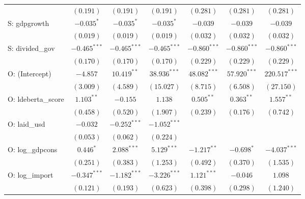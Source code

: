 \begin{table}
\begin{center}
\begin{tabular}{l c c c c c c}
                              & $(0.191)$      & $(0.191)$      & $(0.191)$      & $(0.281)$      & $(0.281)$      & $(0.281)$       \\
S: gdpgrowth                  & $-0.035^{*}$   & $-0.035^{*}$   & $-0.035^{*}$   & $-0.039$       & $-0.039$       & $-0.039$        \\
                              & $(0.019)$      & $(0.019)$      & $(0.019)$      & $(0.032)$      & $(0.032)$      & $(0.032)$       \\
S: divided\_gov               & $-0.465^{***}$ & $-0.465^{***}$ & $-0.465^{***}$ & $-0.860^{***}$ & $-0.860^{***}$ & $-0.860^{***}$  \\
                              & $(0.170)$      & $(0.170)$      & $(0.170)$      & $(0.229)$      & $(0.229)$      & $(0.229)$       \\
O: (Intercept)                & $-4.857$       & $10.419^{**}$  & $38.936^{***}$ & $48.082^{***}$ & $57.920^{***}$ & $220.517^{***}$ \\
                              & $(3.009)$      & $(4.589)$      & $(15.027)$     & $(8.715)$      & $(6.508)$      & $(27.150)$      \\
O: ldeberta\_score            & $1.103^{**}$   & $-0.155$       & $1.138$        & $0.505^{**}$   & $0.363^{**}$   & $1.557^{**}$    \\
                              & $(0.458)$      & $(0.520)$      & $(1.907)$      & $(0.239)$      & $(0.176)$      & $(0.742)$       \\
O: laid\_usd                  & $-0.032$       & $-0.252^{***}$ & $-1.052^{***}$ &                &                &                 \\
                              & $(0.053)$      & $(0.062)$      & $(0.224)$      &                &                &                 \\
O: log\_gdpcons               & $0.446^{*}$    & $2.088^{***}$  & $5.129^{***}$  & $-1.217^{**}$  & $-0.698^{*}$   & $-4.037^{***}$  \\
                              & $(0.251)$      & $(0.383)$      & $(1.253)$      & $(0.492)$      & $(0.370)$      & $(1.535)$       \\
O: log\_import                & $-0.347^{***}$ & $-1.182^{***}$ & $-3.226^{***}$ & $1.121^{***}$  & $-0.046$       & $1.098$         \\
                              & $(0.121)$      & $(0.193)$      & $(0.623)$      & $(0.398)$      & $(0.298)$      & $(1.240)$       \\

\end{tabular}
\end{center}
\end{table}
